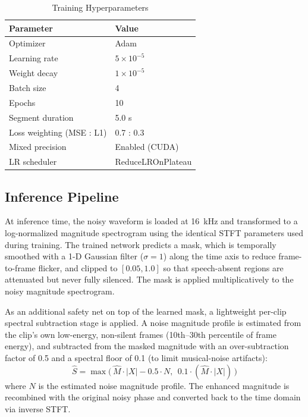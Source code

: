 \documentclass[conference]{IEEEtran}
\begin{document}
\begin{table}[htbp]
\caption{Training Hyperparameters}
\begin{center}
\begin{tabular}{ll}
\toprule
\textbf{Parameter} & \textbf{Value} \\
\midrule
Optimizer & Adam \\
Learning rate & $5\times10^{-5}$ \\
Weight decay & $1\times10^{-5}$ \\
Batch size & 4 \\
Epochs & 10 \\
Segment duration & 5.0 s \\
Loss weighting (MSE : L1) & 0.7 : 0.3 \\
Mixed precision & Enabled (CUDA) \\
LR scheduler & ReduceLROnPlateau \\
\bottomrule
\end{tabular}
\label{tab:hparams}
\end{center}
\end{table}

\subsection{Inference Pipeline}
At inference time, the noisy waveform is loaded at 16~kHz and transformed to a log-normalized magnitude spectrogram using the identical STFT parameters used during training. The trained network predicts a mask, which is temporally smoothed with a 1-D Gaussian filter ($\sigma=1$) along the time axis to reduce frame-to-frame flicker, and clipped to $[0.05, 1.0]$ so that speech-absent regions are attenuated but never fully silenced. The mask is applied multiplicatively to the noisy magnitude spectrogram.

As an additional safety net on top of the learned mask, a lightweight per-clip spectral subtraction stage is applied. A noise magnitude profile is estimated from the clip's own low-energy, non-silent frames (10th--30th percentile of frame energy), and subtracted from the masked magnitude with an over-subtraction factor of 0.5 and a spectral floor of 0.1 (to limit musical-noise artifacts):
\begin{equation}
\hat{S} = \max\big(\,\hat{M}\!\cdot\!|X| - 0.5\cdot N,\ \ 0.1\cdot(\hat{M}\!\cdot\!|X|)\,\big)
\end{equation}
where $N$ is the estimated noise magnitude profile. The enhanced magnitude is recombined with the original noisy phase and converted back to the time domain via inverse STFT.
\end{document}
